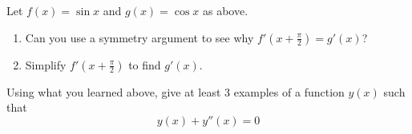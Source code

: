 \documentclass[12pt, a4paper]{article}
\begin{document}
\begin{ex}
  Let \(f(x) = \sin x\) and \(g(x) = \cos x\) as above.
  \begin{enumerate}
  \item   Can you use a
  symmetry argument to see why \(f'\left(x+\frac{\pi}{2}\right) = g'(x)\)? 
  \item Simplify \(f'\left(x+\frac{\pi}{2}\right)\) to find \(g'(x)\).
  \end{enumerate}
\end{ex}
\begin{ex}
  Using what you learned above, give at least \(3\) examples of a
  function \(y(x)\) such that \[
    y(x)+y''(x) = 0
  \]
\end{ex}
\end{document}
